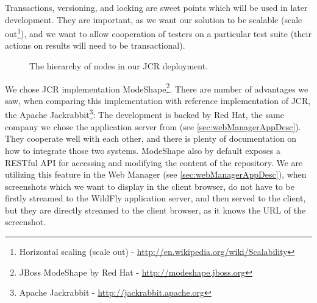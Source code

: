 \documentclass[11pt,oneside,final]{fithesis2}
\begin{document}
    Transactions, versioning, and locking are sweet points which will be used in later development. They are important, as we want
    our solution to be scalable 
    (scale out\footnote{Horizontal scaling (scale out) - \url{http://en.wikipedia.org/wiki/Scalability}}),
    and we want to allow cooperation of testers on a particular test suite (their actions on results will need to be transactional).
    
    \begin{figure}[!htb]
      \begin{center}
      \leavevmode
      \centerline{}
      \end{center}
      \caption{The hierarchy of nodes in our JCR deployment.}
      \label{fig:ourJCRHierarchy}
    \end{figure}
    
    \label{sec:whyWeChooseJCR}
    We chose JCR implementation ModeShape\footnote{JBoss ModeShape by Red Hat - \url{http://modeshape.jboss.org}}. There are number
    of advantages we saw, when comparing this implementation with reference implementation of JCR, the Apache 
    Jackrabbit\footnote{Apache Jackrabbit - \url{http://jackrabbit.apache.org}}: The development is backed by Red Hat, the same 
    company we chose the application server from (see \ref{sec:webManagerAppDesc}). 
    They cooperate well with each other, and there is plenty of documentation on how to integrate those two systems.
    ModeShape also by default exposes a RESTful API for accessing and modifying the content of the repository. We are utilizing 
    this feature in the Web Manager (see \ref{sec:webManagerAppDesc}), when screenshots which we want to display in the client browser,
    do not have to be firstly streamed to the WildFly application server, and then served to the client, but they are directly
    streamed to the client browser, as it knows the URL of the screenshot.
    
\end{document}
